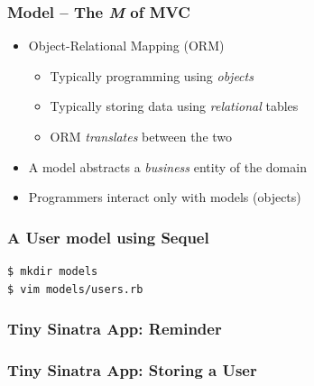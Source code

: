 \documentclass{beamer}
\begin{document}
\begin{frame}[fragile]\frametitle{Model -- The \textit{M} of MVC}

  \begin{itemize}
  
    \item Object-Relational Mapping (ORM)
    \begin{itemize}
      \item Typically programming using \textit{objects} 
      \item Typically storing data using \textit{relational} tables
      \item ORM \textit{translates} between the two
    \end{itemize}

    \item A model abstracts a \textit{business} entity of the domain

    \item Programmers interact only with models (objects)

  \end{itemize}

\end{frame}




\begin{frame}[fragile]\frametitle{A User model using Sequel}

  \begin{lstlisting}[language=bash, escapechar={^}]
$ mkdir models
$ vim models/users.rb 
  \end{lstlisting}

  
  
\end{frame}



\begin{frame}[fragile]\frametitle{Tiny Sinatra App: Reminder}

  
  
  
  
\end{frame}




\begin{frame}[fragile]\frametitle{Tiny Sinatra App: Storing a User}

  
  
  
  
\end{frame}
\end{document}
